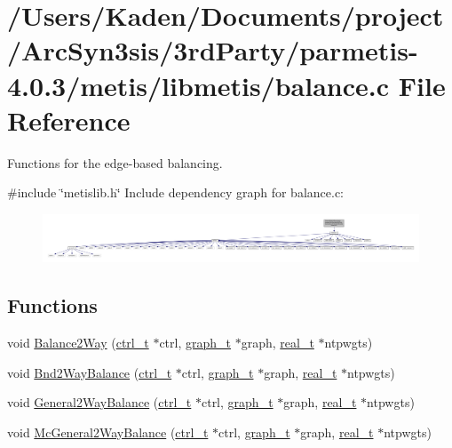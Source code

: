 \hypertarget{a00173}{}\section{/\+Users/\+Kaden/\+Documents/project/\+Arc\+Syn3sis/3rd\+Party/parmetis-\/4.0.3/metis/libmetis/balance.c File Reference}
\label{a00173}


Functions for the edge-\/based balancing.  


{\ttfamily \#include \char`\"{}metislib.\+h\char`\"{}}\newline
Include dependency graph for balance.\+c\+:\nopagebreak
\begin{figure}[H]
\begin{center}
\leavevmode
\includegraphics[width=350pt]{a00174}
\end{center}
\end{figure}
\subsection*{Functions}
\begin{DoxyCompactItemize}
\item 
void \hyperlink{a00173_a11bd5be7764194a2bb8d6cfe580a30b8}{Balance2\+Way} (\hyperlink{a00742}{ctrl\+\_\+t} $\ast$ctrl, \hyperlink{a00734}{graph\+\_\+t} $\ast$graph, \hyperlink{a00876_a1924a4f6907cc3833213aba1f07fcbe9}{real\+\_\+t} $\ast$ntpwgts)
\item 
void \hyperlink{a00173_ab06911b71a6e285ceb52bb80b6592e79}{Bnd2\+Way\+Balance} (\hyperlink{a00742}{ctrl\+\_\+t} $\ast$ctrl, \hyperlink{a00734}{graph\+\_\+t} $\ast$graph, \hyperlink{a00876_a1924a4f6907cc3833213aba1f07fcbe9}{real\+\_\+t} $\ast$ntpwgts)
\item 
void \hyperlink{a00173_a726f3ab2e1dbf55fcf3c6a31037542f5}{General2\+Way\+Balance} (\hyperlink{a00742}{ctrl\+\_\+t} $\ast$ctrl, \hyperlink{a00734}{graph\+\_\+t} $\ast$graph, \hyperlink{a00876_a1924a4f6907cc3833213aba1f07fcbe9}{real\+\_\+t} $\ast$ntpwgts)
\item 
void \hyperlink{a00173_a765ccbdaa41401e55a2b6d350964f289}{Mc\+General2\+Way\+Balance} (\hyperlink{a00742}{ctrl\+\_\+t} $\ast$ctrl, \hyperlink{a00734}{graph\+\_\+t} $\ast$graph, \hyperlink{a00876_a1924a4f6907cc3833213aba1f07fcbe9}{real\+\_\+t} $\ast$ntpwgts)
\end{DoxyCompactItemize}


